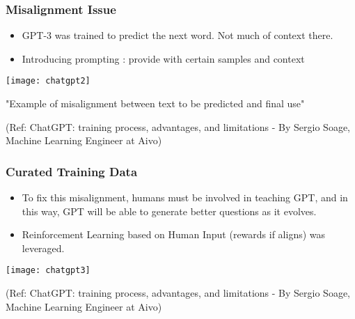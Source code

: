 \begin{frame}[fragile]\frametitle{Misalignment Issue}


\begin{itemize}
\item GPT-3 was trained to predict the next word. Not much of context there.
\item Introducing prompting : provide with certain samples and context

\end{itemize}	 

			\begin{center}
			\texttt{[image: chatgpt2]}
			
			{\tiny "Example of misalignment between text to be predicted and final use"}
			\end{center}		
			
			
			{\tiny (Ref: ChatGPT: training process, advantages, and limitations - By Sergio Soage, Machine Learning Engineer at Aivo)}
			
\end{frame}

\begin{frame}[fragile]\frametitle{Curated Training Data}


\begin{itemize}
\item To fix this misalignment, humans must be involved in teaching GPT, and in this way, GPT will be able to generate better questions as it evolves.
\item Reinforcement Learning based on Human Input (rewards if aligns) was leveraged.
\end{itemize}	 

			\begin{center}
			\texttt{[image: chatgpt3]}
			
			\end{center}		
			
			{\tiny (Ref: ChatGPT: training process, advantages, and limitations - By Sergio Soage, Machine Learning Engineer at Aivo)}
			
\end{frame}


